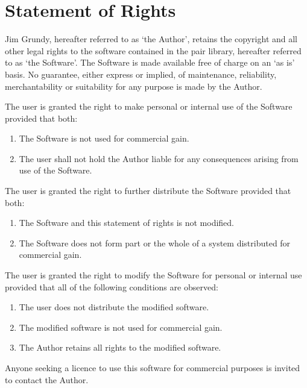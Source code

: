 \chapter{Statement of Rights}

Jim Grundy, hereafter referred to as `the Author', retains the        
copyright and all other legal rights to the software contained in     
the pair library, hereafter referred to as `the Software'.                   
The Software is made available free of charge on an `as is' basis.
No guarantee, either express or implied, of maintenance, reliability,
merchantability or suitability for any purpose is made by the Author.

The user is granted the right to make personal or internal use        
of the Software provided that both:                                   
\begin{enumerate}
    \item   The Software is not used for commercial gain.                   
    \item   The user shall not hold the Author liable for any consequences 
            arising from use of the Software.
\end{enumerate}
The user is granted the right to further distribute the Software      
provided that both:                                                   
\begin{enumerate}
    \item   The Software and this statement of rights is not modified.     
    \item   The Software does not form part or the whole of a system        
            distributed for commercial gain.                                   
\end{enumerate}
The user is granted the right to modify the Software for personal or  
internal use provided that all of the following conditions are        
observed:                                                             
\begin{enumerate}
    \item   The user does not distribute the modified software.             
    \item   The modified software is not used for commercial gain.          
    \item   The Author retains all rights to the modified software.         
\end{enumerate}
                                                                      
Anyone seeking a licence to use this software for commercial purposes 
is invited to contact the Author.                                     

